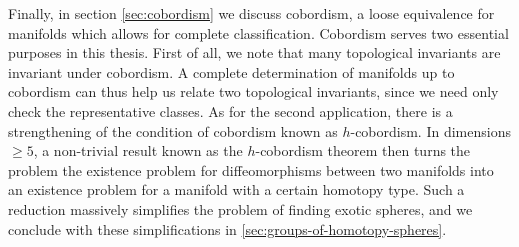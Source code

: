 Finally, in section \cref{sec:cobordism} we discuss cobordism, a loose equivalence for manifolds which allows for complete classification. Cobordism serves two essential purposes in this thesis. First of all, we note that many topological invariants are invariant under cobordism. A complete determination of manifolds up to cobordism can thus help us relate two topological invariants, since we need only check the representative classes. As for the second application, there is a strengthening of the condition of cobordism known as $h$-cobordism. 
In dimensions $\geq 5$, a non-trivial result known as the $h$-cobordism theorem then turns the problem the existence problem for diffeomorphisms between two manifolds into an existence problem for a manifold with a certain homotopy type.
Such a reduction massively simplifies the problem of finding exotic spheres, and we conclude with these simplifications in \cref{sec:groups-of-homotopy-spheres}.






